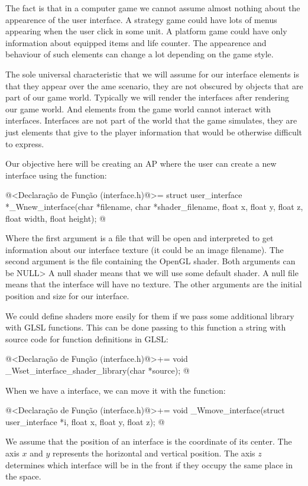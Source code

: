 The fact is that in a computer game we cannot assume almost nothing
about the appearence of the user interface. A strategy game could have
lots of menus appearing when the user click in some unit. A platform
game could have only information about equipped items and life
counter. The appearence and behaviour of such elements can change a
lot depending on the game style.

The sole universal characteristic that we will assume for our
interface elements is that they appear over the ame scenario, they are
not obscured by objects that are part of our game world. Typically we
will render the interfaces after rendering our game world. And
elements from the game world cannot interact with
interfaces. Interfaces are not part of the world that the game
simulates, they are just elements that give to the player information
that would be otherwise difficult to express.

Our objective here will be creating an AP where the user can create a
new interface using the function:

\iniciocodigo
@<Declaração de Função (interface.h)@>=
struct user_interface *_Wnew_interface(char *filename, char *shader_filename,
                                  float x, float y, float z, float width,
                                  float height);
@
\fimcodigo

Where the first argument is a file that will be open and interpreted
to get information about our interface texture (it could be an image
filename). The second argument is the file containing the OpenGL
shader. Both arguments can be NULL> A null shader means that we will
use some default shader. A null file means that the interface will
have no texture. The other arguments are the initial position and size
for our interface.

We could define shaders more easily for them if we pass some
additional library with GLSL functions. This can be done passing to
this function a string with source code for function definitions in
GLSL:

\iniciocodigo
@<Declaração de Função (interface.h)@>+=
void _Wset_interface_shader_library(char *source);
@
\fimcodigo


When we have a interface, we can move it with the function:

\iniciocodigo
@<Declaração de Função (interface.h)@>+=
void _Wmove_interface(struct user_interface *i, float x, float y, float z);
@
\fimcodigo

We assume that the position of an interface is the coordinate of its
center. The axis $x$ and $y$ represents the horizontal and vertical
position. The axis $z$ determines which interface will be in the front
if they occupy the same place in the space.

